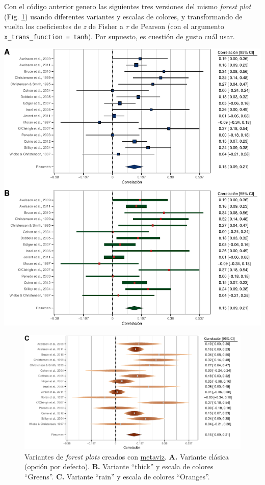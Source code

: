 \documentclass[
  bookmarksnumbered]{article}
\begin{document}
Con el código anterior genero las siguientes tres versiones del mismo \emph{forest plot} (Fig. \ref{fig:for-plot3b}) usando diferentes variantes y escalas de colores, y transformando de vuelta los coeficientes de \emph{z} de Fisher a \emph{r} de Pearson (con el argumento \texttt{x\_trans\_function\ =\ tanh}). Por supuesto, es cuestión de gusto cuál usar.

\includegraphics{Meta-analysis_files/figure-latex/for-plot3-1.pdf}

\begin{figure}
\centering
\includegraphics{Meta-analysis_files/figure-latex/for-plot3b-1.pdf}
\caption{\label{fig:for-plot3b}Variantes de \emph{forest plots} creados con \href{https://cran.r-project.org/web/packages/metaviz/vignettes/metaviz.html}{metaviz}. \textbf{A.} Variante clásica (opción por defecto). \textbf{B.} Variante ``thick'' y escala de colores ``Greens''. \textbf{C.} Variante ``rain'' y escala de colores ``Oranges''.}
\end{figure}
\end{document}
